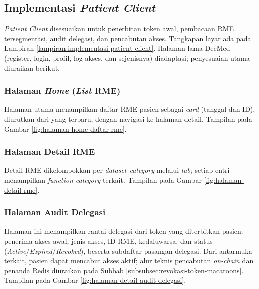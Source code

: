 \subsection{Implementasi \textit{Patient Client}}
\label{subsec:implementasi-patient-client}

\textit{Patient Client} disesuaikan untuk penerbitan token awal, pembacaan RME tersegmentasi, audit delegasi, dan pencabutan akses. Tangkapan layar ada pada Lampiran \ref{lampiran:implementasi-patient-client}. Halaman lama DecMed (register, login, profil, log akses, dan sejenisnya) diadaptasi; penyesuaian utama diuraikan berikut.

\subsubsection{Halaman \textit{Home} (\textit{List} RME)}
\label{subsubsec:halaman-home-daftar-rme}

Halaman utama menampilkan daftar RME pasien sebagai \textit{card} (tanggal dan ID), diurutkan dari yang terbaru, dengan navigasi ke halaman detail. Tampilan pada Gambar \ref{fig:halaman-home-daftar-rme}.

\subsubsection{Halaman Detail RME}
\label{subsubsec:halaman-detail-rme}

Detail RME dikelompokkan per \textit{dataset category} melalui \textit{tab}; setiap entri menampilkan \textit{function category} terkait. Tampilan pada Gambar \ref{fig:halaman-detail-rme}.

\subsubsection{Halaman Audit Delegasi}
\label{subsubsec:halaman-audit-delegasi}

Halaman ini menampilkan rantai delegasi dari token yang diterbitkan pasien: penerima akses awal, jenis akses, ID RME, kedaluwarsa, dan status (\textit{Active}/\textit{Expired}/\textit{Revoked}), beserta subdaftar pasangan delegasi. Dari antarmuka terkait, pasien dapat mencabut akses aktif; alur teknis pencabutan \textit{on-chain} dan penanda Redis diuraikan pada Subbab \ref{subsubsec:revokasi-token-macaroons}. Tampilan pada Gambar \ref{fig:halaman-detail-audit-delegasi}.

